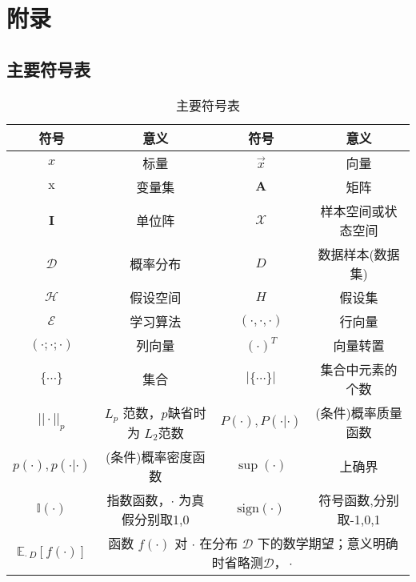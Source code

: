 \chapter{附录}

\section{主要符号表}

\begin{table}[H]
    \centering
    \caption{主要符号表}
    \label{table:主要符号表}
    \setlength{\tabcolsep}{4mm}
    \begin{tabular}{c|c|c|c}
        \toprule
        \textbf{符号} & \textbf{意义} & \textbf{符号} & \textbf{意义} \\
        \midrule
        $x$ & 标量 & $\vec{x}$ & 向量 \\
        $\mathrm{x}$ & 变量集 & $\mathbf{A}$ & 矩阵 \\
        $\mathbf{I}$ & 单位阵 & $\mathcal{X}$ & 样本空间或状态空间 \\
        $\mathcal{D}$ & 概率分布 & $D$ & 数据样本(数据集) \\
        $\mathcal{H}$ & 假设空间 & $H$ & 假设集 \\
        $\mathcal{E} $ & 学习算法 & $(\cdot,\cdot,\cdot)$ & 行向量 \\
        $(\cdot;\cdot;\cdot)$ & 列向量 & $(\cdot)^T$ & 向量转置 \\
        $\{\cdots\}$ & 集合 & $|\{\cdots\}|$ & 集合中元素的个数 \\
        $||\cdot||_p$ & $L_p$ 范数，$p$缺省时为 $L_2$范数 & $P(\cdot),P(\cdot|\cdot)$ & (条件)概率质量函数 \\
        $p(\cdot),p(\cdot|\cdot)$ & (条件)概率密度函数 & $\sup(\cdot)$ & 上确界 \\
        $\mathbb{I} (\cdot)$ & 指数函数，$\cdot$ 为真假分别取1,0 & $\text{sign}(\cdot)$ & 符号函数,分别取-1,0,1 \\
        \midrule
        $\mathbb{E}_{\cdot ~D}[f(\cdot)]$ & \multicolumn{3}{c}{函数 $f(\cdot)$ 对 $\cdot$ 在分布 $\mathcal{D}$ 下的数学期望；意义明确时省略测$\mathcal{D}，\cdot$} \\
        \bottomrule
    \end{tabular}
\end{table}